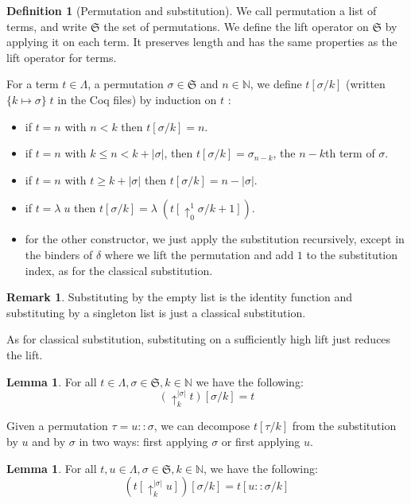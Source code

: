 \documentclass{article}
\newcommand{\bN}[0]{\mathbb N}
\newcommand{\lift}[2]{\uparrow_{#1}^{#2}}
\newcommand{\fS}[0]{\mathfrak S}
\theoremstyle{definition}
\newtheorem{defi}{Definition}
\newtheorem{lem}[prop]{Lemma}
\newtheorem*{rmk}{Remark}
\begin{document}
\begin{defi}[Permutation and substitution]
    We call permutation a list of terms, and write $\fS$ the set of permutations. We define the lift operator
    on $\fS$ by applying it on each term. It preserves length and has the same properties as the lift
    operator for terms.
    
    For a term $t\in\Lambda$,
    a permutation $\sigma\in\fS$ and $n\in\bN$, we define $t[\sigma/k]$ (written $\{k\mapsto \sigma\}\;t$ in
    the Coq files) by induction on $t$ :
    \begin{itemize}
        \item if $t = n$ with $n < k$ then $t[\sigma/k] = n$.
        \item if $t = n$ with $k \leq n < k+|\sigma|$, then $t[\sigma/k] = \sigma_{n-k}$, the $n-k$th term of
        $\sigma$.
        \item if $t = n$ with $t \geq k + |\sigma|$ then $t[\sigma/k] = n-|\sigma|$.
        \item if $t = \lambda\;u$ then $t[\sigma/k] = \lambda\;(t[\lift 0 1 \sigma/k + 1])$.
        \item for the other constructor, we just apply the substitution recursively, except in the binders of
        $\delta$ where we lift the permutation and add $1$ to the substitution index, as for the classical
        substitution.
    \end{itemize}
\end{defi}

\begin{rmk}
    Substituting by the empty list is the identity function and substituting by a singleton list is just a
    classical substitution.
\end{rmk}

As for classical substitution, substituting on a sufficiently high lift just reduces the lift.
\begin{lem}
    For all $t\in\Lambda, \sigma\in\fS,k\in\bN$ we have the following:
    $$(\lift k {|\sigma|} t)[\sigma/k] = t$$
\end{lem}

Given a permutation $\tau = u :: \sigma$, we can decompose $t[\tau/k]$ from the substitution by $u$ and by
$\sigma$ in two ways: first applying $\sigma$ or first applying $u$.
\begin{lem}
    For all $t,u\in\Lambda,\sigma\in\fS,k\in\bN$, we have the following:
    $$(t[\lift k {|\sigma|} u])[\sigma/k] = t[u::\sigma/k]$$
\end{lem}
\end{document}
